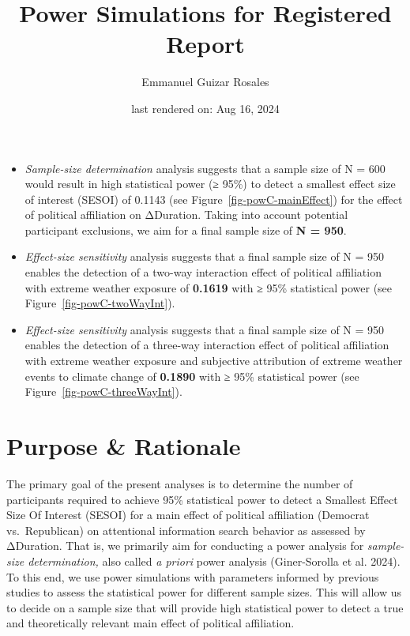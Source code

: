\documentclass[
  letterpaper,
  DIV=11,
  numbers=noendperiod]{scrartcl}
\title{Power Simulations for Registered Report}
\author{Emmanuel Guizar Rosales}
\date{last rendered on: Aug 16, 2024}
\begin{document}
\maketitle

\begin{tcolorbox}[enhanced jigsaw, arc=.35mm, colbacktitle=quarto-callout-note-color!10!white, toptitle=1mm, colframe=quarto-callout-note-color-frame, bottomrule=.15mm, colback=white, titlerule=0mm, leftrule=.75mm, opacityback=0, coltitle=black, breakable, bottomtitle=1mm, title=\textcolor{quarto-callout-note-color}{\faInfo}\hspace{0.5em}{Summary}, toprule=.15mm, left=2mm, rightrule=.15mm, opacitybacktitle=0.6]

\begin{itemize}
\item
  \emph{Sample-size determination} analysis suggests that a sample size
  of N = 600 would result in high statistical power (≥ 95\%) to detect a
  smallest effect size of interest (SESOI) of 0.1143 (see
  Figure~\ref{fig-powC-mainEffect}) for the effect of political
  affiliation on ΔDuration. Taking into account potential participant
  exclusions, we aim for a final sample size of \textbf{N = 950}.
\item
  \emph{Effect-size sensitivity} analysis suggests that a final sample
  size of N = 950 enables the detection of a two-way interaction effect
  of political affiliation with extreme weather exposure of
  \textbf{0.1619} with ≥ 95\% statistical power (see
  Figure~\ref{fig-powC-twoWayInt}).
\item
  \emph{Effect-size sensitivity} analysis suggests that a final sample
  size of N = 950 enables the detection of a three-way interaction
  effect of political affiliation with extreme weather exposure and
  subjective attribution of extreme weather events to climate change of
  \textbf{0.1890} with ≥ 95\% statistical power (see
  Figure~\ref{fig-powC-threeWayInt}).
\end{itemize}

\end{tcolorbox}

\section{Purpose \& Rationale}\label{purpose-rationale}

The primary goal of the present analyses is to determine the number of
participants required to achieve 95\% statistical power to detect a
Smallest Effect Size Of Interest (SESOI) for a main effect of political
affiliation (Democrat vs.~Republican) on attentional information search
behavior as assessed by ΔDuration. That is, we primarily aim for
conducting a power analysis for \emph{sample-size determination,} also
called \emph{a priori} power analysis (Giner-Sorolla et al. 2024). To
this end, we use power simulations with parameters informed by previous
studies to assess the statistical power for different sample sizes. This
will allow us to decide on a sample size that will provide high
statistical power to detect a true and theoretically relevant main
effect of political affiliation.
\end{document}
